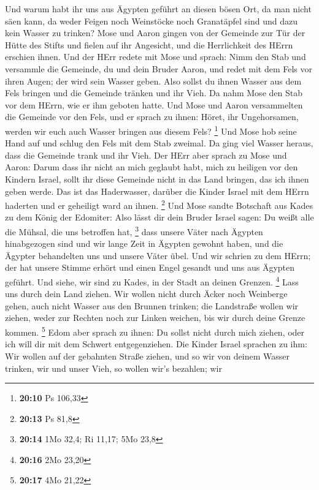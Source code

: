  Und warum habt ihr uns aus Ägypten geführt an diesen bösen
Ort, da man nicht säen kann, da weder Feigen noch Weinstöcke noch
Granatäpfel sind und dazu kein Wasser zu trinken?  Mose und
Aaron gingen von der Gemeinde zur Tür der Hütte des Stifts und fielen
auf ihr Angesicht, und die Herrlichkeit des HErrn erschien ihnen.
 Und der HErr redete mit Mose und sprach:  Nimm
den Stab und versammle die Gemeinde, du und dein Bruder Aaron, und redet
mit dem Fels vor ihren Augen; der wird sein Wasser geben. Also sollst du
ihnen Wasser aus dem Fels bringen und die Gemeinde tränken und ihr Vieh.
 Da nahm Mose den Stab vor dem HErrn, wie er ihm geboten
hatte.  Und Mose und Aaron versammelten die Gemeinde vor
den Fels, und er sprach zu ihnen: Höret, ihr Ungehorsamen, werden wir
euch auch Wasser bringen aus diesem Fels? \footnote{\textbf{20:10} Ps
  106,33}  Und Mose hob seine Hand auf und schlug den Fels
mit dem Stab zweimal. Da ging viel Wasser heraus, dass die Gemeinde
trank und ihr Vieh.  Der HErr aber sprach zu Mose und
Aaron: Darum dass ihr nicht an mich geglaubt habt, mich zu heiligen vor
den Kindern Israel, sollt ihr diese Gemeinde nicht in das Land bringen,
das ich ihnen geben werde.  Das ist das Haderwasser,
darüber die Kinder Israel mit dem HErrn haderten und er geheiligt ward
an ihnen. \footnote{\textbf{20:13} Ps 81,8}  Und Mose
sandte Botschaft aus Kades zu dem König der Edomiter: Also lässt dir
dein Bruder Israel sagen: Du weißt alle die Mühsal, die uns betroffen
hat, \footnote{\textbf{20:14} 1Mo 32,4; Ri 11,17; 5Mo 23,8}
 dass unsere Väter nach Ägypten hinabgezogen sind und wir
lange Zeit in Ägypten gewohnt haben, und die Ägypter behandelten uns und
unsere Väter übel.  Und wir schrien zu dem HErrn; der hat
unsere Stimme erhört und einen Engel gesandt und uns aus Ägypten
geführt. Und siehe, wir sind zu Kades, in der Stadt an deinen Grenzen.
\footnote{\textbf{20:16} 2Mo 23,20}  Lass uns durch dein
Land ziehen. Wir wollen nicht durch Äcker noch Weinberge gehen, auch
nicht Wasser aus den Brunnen trinken; die Landstraße wollen wir ziehen,
weder zur Rechten noch zur Linken weichen, bis wir durch deine Grenze
kommen. \footnote{\textbf{20:17} 4Mo 21,22}  Edom aber
sprach zu ihnen: Du sollst nicht durch mich ziehen, oder ich will dir
mit dem Schwert entgegenziehen.  Die Kinder Israel sprachen
zu ihm: Wir wollen auf der gebahnten Straße ziehen, und so wir von
deinem Wasser trinken, wir und unser Vieh, so wollen wir's bezahlen; wir
